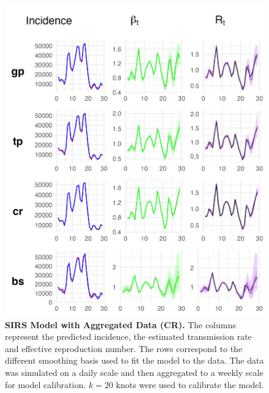\documentclass[
11pt, %
oneside, %
english, %
singlespacing, %
]{macthesis} %
\begin{document}
\begin{figure}[H]
\centering
\includegraphics[width=\textwidth]{figure/Simulated/aggregated/sim_agg_combined_cr.png}
\caption[SIRS model with aggregated data (CR).]{\textbf{SIRS Model with Aggregated Data (CR).} The columns represent the predicted incidence, the estimated transmission rate and effective reproduction number. The rows correspond to the different smoothing basis used to fit the model to the data. The data was simulated on a daily scale and then aggregated to a weekly scale for model calibration. \(k=20\) knots were used to calibrate the model.}
\label{fig:sim_agg_cr}
\end{figure}
\end{document}
